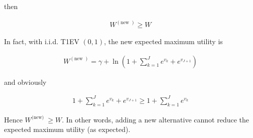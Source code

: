 then

\begin{align*}
W^{(\text {new })} \geq W
\end{align*}


In fact, with i.i.d. T1EV $(0,1)$, the new expected maximum utility is

\begin{align*}
W^{(\text {new })}=\gamma+\ln \left(1+\sum_{k=1}^J e^{v_k}+e^{v_{J+1}}\right)
\end{align*}

and obviously

\begin{align*}
1+\sum_{k=1}^J e^{v_k}+e^{v_{J+1}} \geq 1+\sum_{k=1}^J e^{v_k}
\end{align*}


Hence $W^{\text {(new) }} \geq W$. In other words, adding a new alternative cannot reduce the expected maximum utility (as expected).
